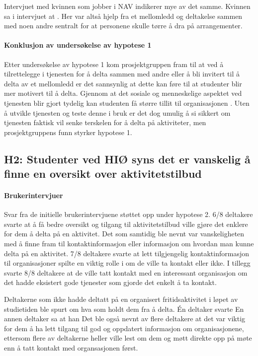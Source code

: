 Intervjuet med kvinnen som jobber i NAV indikerer mye av det samme. Kvinnen sa i intervjuet at  \cite{NAV-INTERVJU:16}. Her var altså hjelp fra et mellomledd og deltakelse sammen med noen andre sentralt for at personene skulle tørre å dra på arrangementer. 

\paragraph{Konklusjon av undersøkelse av hypotese 1}
Etter undersøkelse av hypotese 1 kom prosjektgruppen fram til at ved å tilrettelegge i tjenesten for å delta sammen med andre eller å bli invitert til å delta av et mellomledd er det sannsynlig at dette kan føre til at studenter blir mer motivert til å delta. Gjennom at det sosiale og menneskelige aspektet ved tjenesten blir gjort tydelig kan studenten få større tillit til organisasjonen \cite{MIDTSUNDSTAD-EPOST:14}. Uten å utvikle tjenesten og teste denne i bruk er det dog umulig å si sikkert om tjenesten faktisk vil senke terskelen for å delta på aktiviteter, men prosjektgruppens funn styrker hypotese 1.

\subsection{H2: Studenter ved HIØ syns det er vanskelig å finne en oversikt over aktivitetstilbud}

\paragraph{Brukerintervjuer}
Svar fra de initielle brukerintervjuene støttet opp under hypotese 2. 6/8 deltakere svarte at å få bedre oversikt og tilgang til aktivitetstilbud ville gjøre det enklere for dem å delta på en aktivitet. Det som samtidig ble nevnt var vanskeligheten med å finne fram til kontaktinformasjon eller informasjon om hvordan man kunne delta på en aktivitet. 7/8 deltakere svarte at lett tilgjengelig kontaktinformasjon til organisasjoner spilte en viktig rolle i om de ville ta kontakt eller ikke. I tillegg svarte 8/8 deltakere at de ville tatt kontakt med en interessant organisasjon om det hadde eksistert gode tjenester som gjorde det enkelt å ta kontakt.

Deltakerne som ikke hadde deltatt på en organisert fritidsaktivitet i løpet av studietiden ble spurt om hva som holdt dem fra å delta. Én deltaker svarte  En annen deltaker sa at han  Det ble også nevnt av flere deltakere at det var viktig for dem å ha lett tilgang til god og oppdatert informasjon om organisasjonene, ettersom flere av deltakerne heller ville lest om dem og møtt direkte opp på møte enn å tatt kontakt med organsasjonen først.


